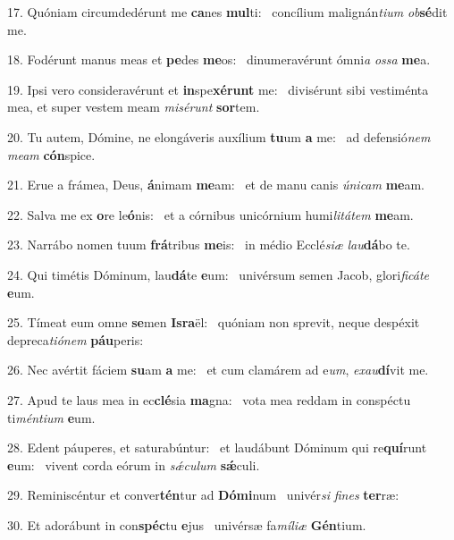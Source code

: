 17. Quóniam circumdedérunt me \textbf{ca}nes \textbf{mul}ti: \ast\  concílium malignán\textit{ti}\textit{um} \textit{ob}\textbf{sé}dit me.\

18. Fodérunt manus meas et \textbf{pe}des \textbf{me}os: \ast\  dinumeravérunt ómni\textit{a} \textit{os}\textit{sa} \textbf{me}a.\

19. Ipsi vero consideravérunt et \textbf{in}spe\textbf{xé}\textbf{runt} me: \ast\  divisérunt sibi vestiménta mea, et super vestem meam \textit{mi}\textit{sé}\textit{runt} \textbf{sor}tem.\

20. Tu autem, Dómine, ne elongáveris auxílium \textbf{tu}um \textbf{a} me: \ast\  ad defensió\textit{nem} \textit{me}\textit{am} \textbf{cón}spice.\

21. Erue a frámea, Deus, \textbf{á}nimam \textbf{me}am: \ast\  et de manu canis \textit{ú}\textit{ni}\textit{cam} \textbf{me}am.\

22. Salva me ex \textbf{o}re le\textbf{ó}nis: \ast\  et a córnibus unicórnium humi\textit{li}\textit{tá}\textit{tem} \textbf{me}am.\

23. Narrábo nomen tuum \textbf{frá}tribus \textbf{me}is: \ast\  in médio Ecclé\textit{si}\textit{æ} \textit{lau}\textbf{dá}bo te.\

24. Qui timétis Dóminum, lau\textbf{dá}te \textbf{e}um: \ast\  univérsum semen Jacob, glori\textit{fi}\textit{cá}\textit{te} \textbf{e}um.\

25. Tímeat eum omne \textbf{se}men \textbf{Is}\textbf{ra}ël: \ast\  quóniam non sprevit, neque despéxit depreca\textit{ti}\textit{ó}\textit{nem} \textbf{páu}peris:\

26. Nec avértit fáciem \textbf{su}am \textbf{a} me: \ast\  et cum clamárem ad e\textit{um}, \textit{ex}\textit{au}\textbf{dí}vit me.\

27. Apud te laus mea in ec\textbf{clé}sia \textbf{ma}gna: \ast\  vota mea reddam in conspéctu ti\textit{mén}\textit{ti}\textit{um} \textbf{e}um.\

28. Edent páuperes, et saturabúntur: \dag\  et laudábunt Dóminum qui re\textbf{quí}runt \textbf{e}um: \ast\  vivent corda eórum in \textit{sǽ}\textit{cu}\textit{lum} \textbf{sǽ}culi.\

29. Reminiscéntur et conver\textbf{tén}tur ad \textbf{Dó}\textbf{mi}num \ast\  univér\textit{si} \textit{fi}\textit{nes} \textbf{ter}ræ:\

30. Et adorábunt in con\textbf{spéc}tu \textbf{e}jus \ast\  univérsæ fa\textit{mí}\textit{li}\textit{æ} \textbf{Gén}tium.\

